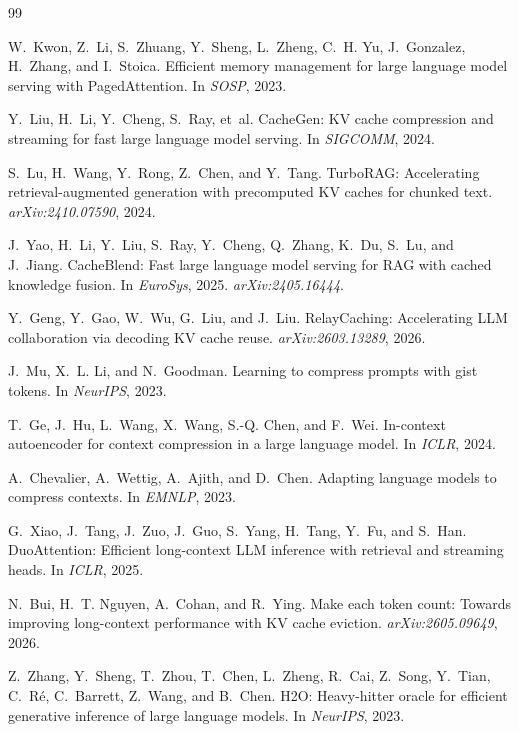 \documentclass[11pt]{article}
\begin{document}
\begin{thebibliography}{99}\small

W.~Kwon, Z.~Li, S.~Zhuang, Y.~Sheng, L.~Zheng, C.~H. Yu, J.~Gonzalez, H.~Zhang, and I.~Stoica.
Efficient memory management for large language model serving with PagedAttention.
In \emph{SOSP}, 2023.

Y.~Liu, H.~Li, Y.~Cheng, S.~Ray, et~al.
CacheGen: KV cache compression and streaming for fast large language model serving.
In \emph{SIGCOMM}, 2024.

S.~Lu, H.~Wang, Y.~Rong, Z.~Chen, and Y.~Tang.
TurboRAG: Accelerating retrieval-augmented generation with precomputed KV caches for chunked text.
\emph{arXiv:2410.07590}, 2024.

J.~Yao, H.~Li, Y.~Liu, S.~Ray, Y.~Cheng, Q.~Zhang, K.~Du, S.~Lu, and J.~Jiang.
CacheBlend: Fast large language model serving for RAG with cached knowledge fusion.
In \emph{EuroSys}, 2025. \emph{arXiv:2405.16444}.

Y.~Geng, Y.~Gao, W.~Wu, G.~Liu, and J.~Liu.
RelayCaching: Accelerating LLM collaboration via decoding KV cache reuse.
\emph{arXiv:2603.13289}, 2026.

J.~Mu, X.~L. Li, and N.~Goodman.
Learning to compress prompts with gist tokens.
In \emph{NeurIPS}, 2023.

T.~Ge, J.~Hu, L.~Wang, X.~Wang, S.-Q. Chen, and F.~Wei.
In-context autoencoder for context compression in a large language model.
In \emph{ICLR}, 2024.

A.~Chevalier, A.~Wettig, A.~Ajith, and D.~Chen.
Adapting language models to compress contexts.
In \emph{EMNLP}, 2023.

G.~Xiao, J.~Tang, J.~Zuo, J.~Guo, S.~Yang, H.~Tang, Y.~Fu, and S.~Han.
DuoAttention: Efficient long-context LLM inference with retrieval and streaming heads.
In \emph{ICLR}, 2025.

N.~Bui, H.~T. Nguyen, A.~Cohan, and R.~Ying.
Make each token count: Towards improving long-context performance with KV cache eviction.
\emph{arXiv:2605.09649}, 2026.

Z.~Zhang, Y.~Sheng, T.~Zhou, T.~Chen, L.~Zheng, R.~Cai, Z.~Song, Y.~Tian, C.~R{\'e}, C.~Barrett, Z.~Wang, and B.~Chen.
H2O: Heavy-hitter oracle for efficient generative inference of large language models.
In \emph{NeurIPS}, 2023.


\end{thebibliography}
\end{document}
